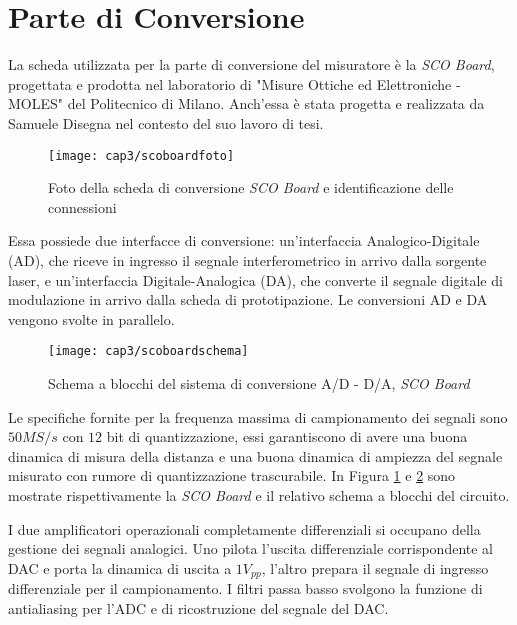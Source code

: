 \section{Parte di Conversione}
La scheda utilizzata per la parte di conversione del misuratore è la \textit{SCO Board}, progettata e prodotta nel laboratorio di "Misure Ottiche ed Elettroniche - MOLES" del Politecnico di Milano. Anch'essa è stata progetta e realizzata da Samuele Disegna nel contesto del suo lavoro di tesi.
\begin{figure}  
  \begin{center}
    \texttt{[image: cap3/scoboardfoto]}
    \caption{Foto della scheda di conversione \textit{SCO Board} e identificazione delle connessioni}
    \label{scoboardfoto}
  \end{center}
\end{figure}

Essa possiede due interfacce di conversione: un'interfaccia Analogico-Digitale (AD), che riceve in ingresso il segnale interferometrico in arrivo dalla sorgente laser, e un'interfaccia Digitale-Analogica (DA), che converte il segnale digitale di modulazione in arrivo dalla scheda di prototipazione. Le conversioni AD e DA vengono svolte in parallelo.
\begin{figure}  
  \begin{center}
    \texttt{[image: cap3/scoboardschema]}
    \caption{Schema a blocchi del sistema di conversione A/D - D/A, \textit{SCO Board}}
    \label{scoboardschema}
  \end{center}
\end{figure}

Le specifiche fornite per la frequenza massima di campionamento dei segnali sono $50MS/s$ con $12$ bit di quantizzazione, essi garantiscono di avere una buona dinamica di misura della distanza e una buona dinamica di ampiezza del segnale misurato con rumore di quantizzazione trascurabile. In Figura \ref{scoboardfoto} e \ref{scoboardschema} sono mostrate rispettivamente la \textit{SCO Board} e il relativo schema a blocchi del circuito.

I due amplificatori operazionali completamente differenziali si occupano della gestione dei segnali analogici. Uno pilota l'uscita differenziale corrispondente al DAC e porta la dinamica di uscita a $1V_{pp}$, l'altro prepara il segnale di ingresso differenziale per il campionamento. I filtri passa basso svolgono la funzione di antialiasing per l'ADC e di ricostruzione del segnale del DAC.

